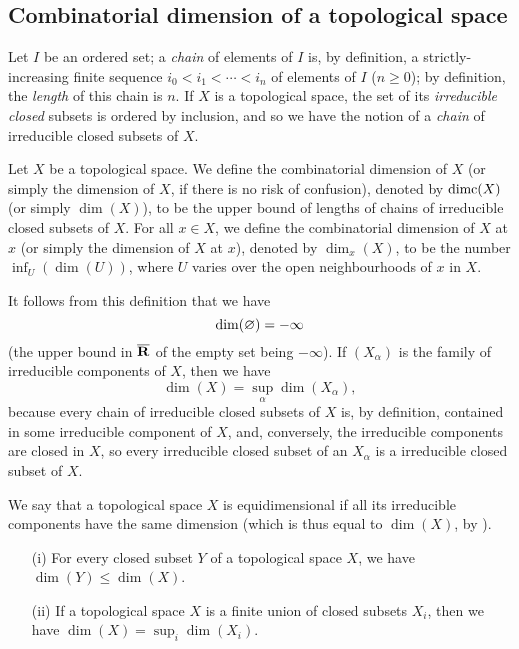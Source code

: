 \subsection{Combinatorial dimension of a topological space}
\label{subsection:0.14.1}

\begin{env}[14.1.1]
\label{0.14.1.1}
Let $I$ be an ordered set; a \emph{chain} of elements of $I$ is, by definition, a strictly-increasing finite sequence $i_0<i_1<\cdots<i_n$ of elements of $I$ ($n\geq 0$); by definition, the \emph{length} of this chain is $n$.
If $X$ is a topological space, the set of its \emph{irreducible closed} subsets is ordered by inclusion, and so we have the notion of a \emph{chain} of irreducible closed subsets of $X$.
\end{env}

\begin{definition}[14.1.2]
\label{0.14.1.2}
Let $X$ be a topological space.
We define the combinatorial dimension of $X$ (or simply the dimension of $X$, if there is no risk of confusion), denoted by $\operatorname{dimc}(X)$ (or simply $\dim(X)$), to be the upper bound of lengths of chains of irreducible closed subsets of $X$.
For all $x\in X$, we define the combinatorial dimension of $X$ at $x$ (or simply the dimension of $X$ at $x$), denoted by $\dim_x(X)$, to be the number $\inf_U(\dim(U))$, where $U$ varies over the open neighbourhoods of $x$ in $X$.
\end{definition}

It follows from this definition that we have
\[
  \dim(\varnothing)=-\infty
\]
(the upper bound in $\overline{\mathbf{R}}$ of the empty set being $-\infty$).
If $(X_\alpha)$ is the family of irreducible components of $X$, then we have
\[
\label{0.14.1.2.1}
  \dim(X)=\sup_\alpha\dim(X_\alpha),
  \tag{14.1.2.1}
\]
because every chain of irreducible closed subsets of $X$ is, by definition, contained in some irreducible component of $X$, and, conversely, the irreducible components are closed in $X$, so every irreducible closed subset of an $X_\alpha$ is a irreducible closed subset of $X$.

\begin{definition}[14.1.3]
\label{0.14.1.3}
We say that a topological space $X$ is equidimensional if all its irreducible components have the same dimension (which is thus equal to $\dim(X)$, by ).
\end{definition}

\begin{proposition}[14.1.4]
\label{0.14.1.4}
\medskip\noindent
\begin{enumerate}
  \item[{\rm(i)}] For every closed subset $Y$ of a topological space $X$, we have $\dim(Y)\leq\dim(X)$.
  \item[{\rm(ii)}] If a topological space $X$ is a finite union of closed subsets $X_i$, then we have $\dim(X)=\sup_i\dim(X_i)$.
\end{enumerate}
\end{proposition}

